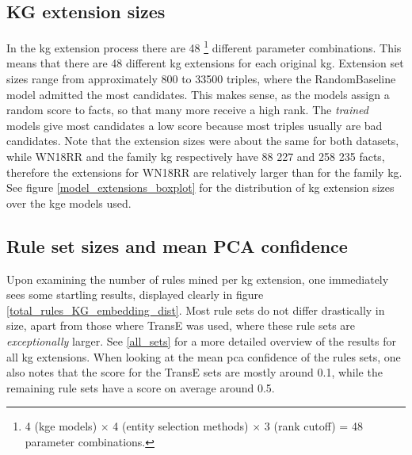 \subsection{KG extension sizes}
In the \gls{kg} extension process there are 48 \footnote{4 (\gls{kge} models) $\times$ 4 (entity selection methods) $\times$ 3 (rank cutoff) = 48 parameter combinations.} different parameter combinations. This means that there are 48 different \gls{kg} extensions for each original \gls{kg}. Extension set sizes range from approximately 800 to 33500 triples, where the RandomBaseline model admitted the most candidates. This makes sense, as the models assign a random score to facts, so that many more receive a high rank. The \textit{trained} models give most candidates a low score because most triples usually are bad candidates. Note that the extension sizes were about the same for both datasets, while WN18RR and the family \gls{kg} respectively have 88 227 and 258 235 facts, therefore the extensions for WN18RR are relatively larger than for the family \gls{kg}. See figure \ref{model_extensions_boxplot} for the distribution of \gls{kg} extension sizes over the \gls{kge} models used.

\subsection{Rule set sizes and mean PCA confidence}
\label{TransE_sucks} 
Upon examining the number of rules mined per \gls{kg} extension, one immediately sees some startling results, displayed clearly in figure \ref{total_rules_KG_embedding_dist}. Most rule sets do not differ drastically in size, apart from those where TransE was used, where these rule sets are \textit{exceptionally} larger. See \cref{all_sets} for a more detailed overview of the results for all \gls{kg} extensions. When looking at the mean \gls{pca} confidence of the rules sets, one also notes that the score for the TransE sets are mostly around 0.1, while the remaining rule sets have a score on average around 0.5.

